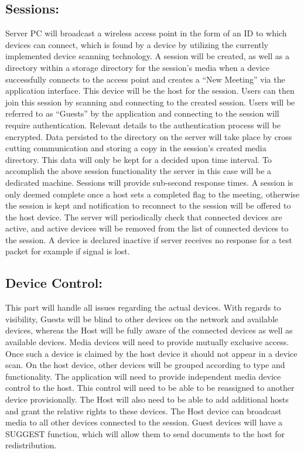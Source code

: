 \documentclass[12pt]{article}
\begin{document}
\subsection{Sessions:}
Server PC will broadcast a wireless access point in the form of an ID to which devices can connect, which is found by a device by utilizing the currently implemented device scanning technology.  A session will be created, as well as a directory within a storage directory for the session’s media when a device successfully connects to the access point and creates a “New Meeting” via the application interface.  This device will be the host for the session.  Users can then join this session by scanning and connecting to the created session.  Users will be referred to as “Guests” by the application and connecting to the session will require authentication.  Relevant details to the authentication process will be encrypted.
Data persisted to the directory on the server will take place by cross cutting communication and storing a copy in the session’s created media directory.  This data will only be kept for a decided upon time interval.  To accomplish the above session functionality the server in this case will be a dedicated machine.  Sessions will provide sub-second response times.  A session is only deemed complete once a host sets a completed flag to the meeting, otherwise the session is kept and notification to reconnect to the session will be offered to the host device.  The server will periodically check that connected devices are active, and active devices will be removed from the list of connected devices to the session.  A device is declared inactive if server receives no response for a test packet for example if signal is lost.

\subsection{Device Control:}
This part will handle all issues regarding the actual devices.  
With regards to visibility, Guests will be blind to other devices on the network and available devices, whereas the Host will be fully aware of the connected devices as well as available devices.  Media devices will need to provide mutually exclusive access.  Once such a device is claimed by the host device it should not appear in a device scan.  On the host device, other devices will be grouped according to type and functionality.  The application will need to provide independent media device control to the host.  This control will need to be able to be reassigned to another device provisionally.  The Host will also need to be able to add additional hosts and grant the relative rights to these devices.  The Host device can broadcast media to all other devices connected to the session.
Guest devices will have a SUGGEST function, which will allow them to send documents to the host for redistribution.
\end{document}
